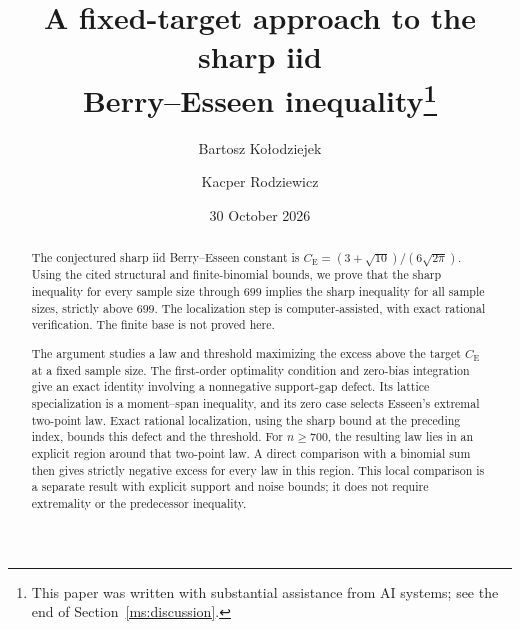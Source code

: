 \documentclass[11pt,a4paper]{article}
\title{A fixed-target approach to the sharp iid\\
Berry--Esseen inequality\thanks{This paper was written with substantial
assistance from AI systems; see the end of Section~\ref{ms:discussion}.}}
\author{Bartosz Ko{\l}odziejek \and Kacper Rodziewicz}
\date{30 October 2026}
\theoremstyle{definition}
\theoremstyle{remark}
\newcommand{\CE}{C_{\mathrm E}}
\begin{document}
\maketitle
\begin{abstract}
The conjectured sharp iid Berry--Esseen constant is
$\CE=(3+\sqrt{10})/(6\sqrt{2\pi})$. Using the cited structural and
finite-binomial bounds, we prove that the sharp inequality for every
sample size through $699$ implies the sharp inequality for all sample
sizes, strictly above $699$. The localization step is computer-assisted,
with exact rational verification. The finite base is not proved here.

The argument studies a law and threshold maximizing the excess above
the target $\CE$ at a fixed sample size. The first-order optimality
condition and zero-bias integration give an exact identity involving
a nonnegative support-gap defect. Its lattice specialization is a
moment--span inequality, and its zero case selects Esseen's extremal
two-point law. Exact rational localization, using the sharp bound at
the preceding index, bounds this defect and the threshold. For
$n\ge700$, the resulting law lies in an explicit region around that
two-point law. A direct comparison with a binomial sum then gives
strictly negative excess for every law in this region. This local
comparison is a separate result with explicit support and noise bounds;
it does not require extremality or the predecessor inequality.
\end{abstract}
\begingroup\small
\makeatletter
\renewcommand{\l@section}{\@dottedtocline{1}{0em}{1.5em}}
\makeatother
\tableofcontents
\endgroup
\clearpage











\appendix





\begingroup\small\raggedright{}


\endgroup
\end{document}
